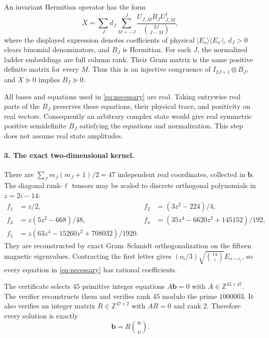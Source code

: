 \documentclass[11pt]{article}
\begin{document}
An invariant Hermitian operator has the form
\[
X=\sum_J d_J\sum_{M=-J}^{J}
\frac{U_{J,M} B_J U_{J,M}^{\dagger}}
{\binom{2J}{J-M}},
\]
where the displayed expression denotes coefficients of physical
$|E_o\rangle\langle E_{o'}|$, $d_J>0$ clears binomial denominators,
and $B_J$ is Hermitian. For each $J$, the normalized ladder embeddings
are full column rank. Their Gram matrix is the same positive definite
matrix for every $M$. Thus this is an injective congruence of
$I_{2J+1}\otimes B_J$, and $X\succeq0$ implies $B_J\succeq0$.

All bases and equations used in \eqref{eq:necessary} are real. Taking
entrywise real parts of the $B_J$ preserves these equations, their
physical trace, and positivity on real vectors. Consequently an
arbitrary complex state would give real symmetric positive semidefinite
$B_J$ satisfying the equations and normalization. This step does not
assume real state amplitudes.

\paragraph{3. The exact two-dimensional kernel.}
There are $\sum_Jm_J(m_J+1)/2=47$ independent real coordinates,
collected in $\mathbf b$. The diagonal rank-$\ell$ tensors may be
scaled to discrete orthogonal polynomials in $z=2i-14$:
\[
\begin{aligned}
f_1&=z/2,&f_2&=(3z^2-224)/4,\\
f_3&=z(5z^2-668)/48,&
f_4&=(35z^4-6620z^2+145152)/192,\\
f_5&=z(63z^4-15260z^2+708032)/1920.
\end{aligned}
\]
They are reconstructed by exact Gram--Schmidt orthogonalization on the
fifteen magnetic eigenvalues. Contracting the first letter gives
$(o_i/3)\sqrt{\binom{14}{i}}E_{o-e_i}$, so every equation in
\eqref{eq:necessary} has rational coefficients.

The certificate selects $45$ primitive integer equations
$A\mathbf b=0$ with $A\in\mathbb Z^{45\times47}$. The verifier
reconstructs them and verifies rank $45$ modulo the prime $1000003$.
It also verifies an integer matrix $R\in\mathbb Z^{47\times2}$ with
$AR=0$ and rank $2$. Therefore every solution is exactly
\[
\mathbf b=R\binom{u}{v}.
\]
\end{document}
